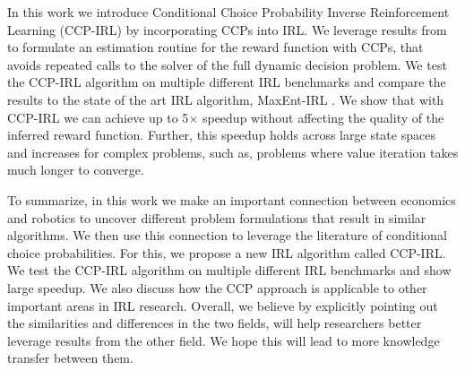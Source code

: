 \documentclass{article}
\begin{document}
In this work we introduce Conditional Choice Probability Inverse Reinforcement Learning (CCP-IRL) by incorporating CCPs into IRL. We leverage results from \cite{rust_gmc, hotz, magnac} to formulate an estimation routine for the reward function with CCPs, that avoids repeated calls to the solver of the full dynamic decision problem. We test the CCP-IRL algorithm on multiple different IRL benchmarks and compare the results to the state of the art IRL algorithm, MaxEnt-IRL \cite{ziebart}. We show that with CCP-IRL we can achieve up to 5$\times$ speedup without affecting the quality of the inferred reward function. Further, this speedup holds across large state spaces and increases for complex problems, such as, problems where value iteration takes much longer to converge. 

To summarize, in this work we make an important connection between economics and robotics to uncover different problem formulations that result in similar algorithms. We then use this connection to leverage the literature of conditional choice probabilities. For this, we propose a new IRL algorithm called CCP-IRL. We test the CCP-IRL algorithm on multiple different IRL benchmarks and show large speedup. We also discuss how the CCP approach is applicable to other important areas in IRL research.
Overall, we believe by explicitly pointing out the similarities and differences in the two fields, will help researchers better leverage results from the other field. We hope this will lead to more knowledge transfer between them.



\end{document}
